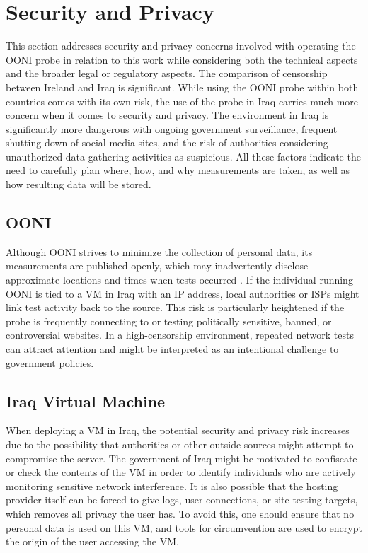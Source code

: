 \chapter{Security and Privacy}

This section addresses security and privacy concerns involved with operating the OONI probe in relation to this work while considering both the technical aspects and the broader legal or regulatory aspects. The comparison of censorship between Ireland and Iraq is significant. While using the OONI probe within both countries comes with its own risk, the use of the probe in Iraq carries much more concern when it comes to security and privacy. The environment in Iraq is significantly more dangerous with ongoing government surveillance, frequent shutting down of social media sites, and the risk of authorities considering unauthorized data-gathering activities as suspicious. All these factors indicate the need to carefully plan where, how, and why measurements are taken, as well as how resulting data will be stored.

\section{OONI}

Although OONI strives to minimize the collection of personal data, its measurements are published openly, which may inadvertently disclose approximate locations and times when tests occurred \cite{ooniOONIPrivacyAndSecurity}. If the individual running OONI is tied to a VM in Iraq with an IP address, local authorities or ISPs might link test activity back to the source. This risk is particularly heightened if the probe is frequently connecting to or testing politically sensitive, banned, or controversial websites. In a high-censorship environment, repeated network tests can attract attention and might be interpreted as an intentional challenge to government policies.

\section{Iraq Virtual Machine}

When deploying a VM in Iraq, the potential security and privacy risk increases due to the possibility that authorities or other outside sources might attempt to compromise the server. The government of Iraq might be motivated to confiscate or check the contents of the VM in order to identify individuals who are actively monitoring sensitive network interference. It is also possible that the hosting provider itself can be forced to give logs, user connections, or site testing targets, which removes all privacy the user has. To avoid this, one should ensure that no personal data is used on this VM, and tools for circumvention are used to encrypt the origin of the user accessing the VM.

